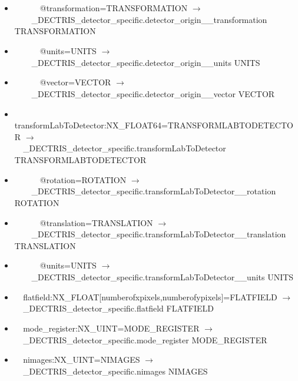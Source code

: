 \documentclass[11pt]{article}
\begin{document}
{{\begin{itemize}
\item{\verb|      |@transformation=TRANSFORMATION $\rightarrow$\\
\verb|    |\_DECTRIS\_detector\_specific.detector\_origin\_\_transformation TRANSFORMATION}

\item{\verb|      |@units=UNITS $\rightarrow$\\
\verb|    |\_DECTRIS\_detector\_specific.detector\_origin\_\_units UNITS}

\item{\verb|      |@vector=VECTOR $\rightarrow$\\
\verb|    |\_DECTRIS\_detector\_specific.detector\_origin\_\_vector VECTOR}

\item{\verb|  |transformLabToDetector:NX\_FLOAT64=TRANSFORMLABTODETECTOR $\rightarrow$\\
\verb|  |\_DECTRIS\_detector\_specific.transformLabToDetector TRANSFORMLABTODETECTOR}

\item{\verb|      |@rotation=ROTATION $\rightarrow$\\
\verb|    |\_DECTRIS\_detector\_specific.transformLabToDetector\_\_rotation ROTATION}

\item{\verb|      |@translation=TRANSLATION $\rightarrow$\\
\verb|    |\_DECTRIS\_detector\_specific.transformLabToDetector\_\_translation TRANSLATION}

\item{\verb|      |@units=UNITS $\rightarrow$\\
\verb|    |\_DECTRIS\_detector\_specific.transformLabToDetector\_\_units UNITS}

\item{\verb|  |flatfield:NX\_FLOAT[numberofxpixels,numberofypixels]=FLATFIELD $\rightarrow$\\
\verb|  |\_DECTRIS\_detector\_specific.flatfield FLATFIELD}

\item{\verb|  |mode\_register:NX\_UINT=MODE\_REGISTER $\rightarrow$\\
\verb|  |\_DECTRIS\_detector\_specific.mode\_register MODE\_REGISTER}

\item{\verb|  |nimages:NX\_UINT=NIMAGES $\rightarrow$\\
\verb|  |\_DECTRIS\_detector\_specific.nimages NIMAGES}


\end{itemize}}}
\end{document}
